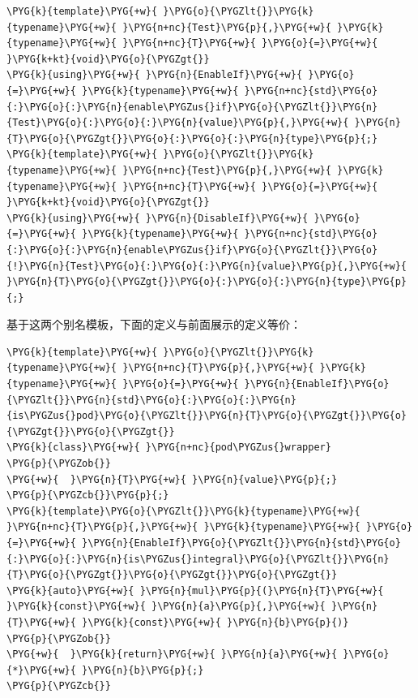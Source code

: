 \begin{codeblockbg}
\begin{Verbatim}[commandchars=\\\{\},breaklines=true,breakanywhere=true,fontsize=\codefont,xleftmargin=17bp]
\PYG{k}{template}\PYG{+w}{ }\PYG{o}{\PYGZlt{}}\PYG{k}{typename}\PYG{+w}{ }\PYG{n+nc}{Test}\PYG{p}{,}\PYG{+w}{ }\PYG{k}{typename}\PYG{+w}{ }\PYG{n+nc}{T}\PYG{+w}{ }\PYG{o}{=}\PYG{+w}{ }\PYG{k+kt}{void}\PYG{o}{\PYGZgt{}}
\PYG{k}{using}\PYG{+w}{ }\PYG{n}{EnableIf}\PYG{+w}{ }\PYG{o}{=}\PYG{+w}{ }\PYG{k}{typename}\PYG{+w}{ }\PYG{n+nc}{std}\PYG{o}{:}\PYG{o}{:}\PYG{n}{enable\PYGZus{}if}\PYG{o}{\PYGZlt{}}\PYG{n}{Test}\PYG{o}{:}\PYG{o}{:}\PYG{n}{value}\PYG{p}{,}\PYG{+w}{ }\PYG{n}{T}\PYG{o}{\PYGZgt{}}\PYG{o}{:}\PYG{o}{:}\PYG{n}{type}\PYG{p}{;}
\PYG{k}{template}\PYG{+w}{ }\PYG{o}{\PYGZlt{}}\PYG{k}{typename}\PYG{+w}{ }\PYG{n+nc}{Test}\PYG{p}{,}\PYG{+w}{ }\PYG{k}{typename}\PYG{+w}{ }\PYG{n+nc}{T}\PYG{+w}{ }\PYG{o}{=}\PYG{+w}{ }\PYG{k+kt}{void}\PYG{o}{\PYGZgt{}}
\PYG{k}{using}\PYG{+w}{ }\PYG{n}{DisableIf}\PYG{+w}{ }\PYG{o}{=}\PYG{+w}{ }\PYG{k}{typename}\PYG{+w}{ }\PYG{n+nc}{std}\PYG{o}{:}\PYG{o}{:}\PYG{n}{enable\PYGZus{}if}\PYG{o}{\PYGZlt{}}\PYG{o}{!}\PYG{n}{Test}\PYG{o}{:}\PYG{o}{:}\PYG{n}{value}\PYG{p}{,}\PYG{+w}{ }\PYG{n}{T}\PYG{o}{\PYGZgt{}}\PYG{o}{:}\PYG{o}{:}\PYG{n}{type}\PYG{p}{;}
\end{Verbatim}
\end{codeblockbg}



基于这两个别名模板，下面的定义与前面展示的定义等价：



\begin{codeblockbg}
\begin{Verbatim}[commandchars=\\\{\},breaklines=true,breakanywhere=true,fontsize=\codefont,xleftmargin=17bp]
\PYG{k}{template}\PYG{+w}{ }\PYG{o}{\PYGZlt{}}\PYG{k}{typename}\PYG{+w}{ }\PYG{n+nc}{T}\PYG{p}{,}\PYG{+w}{ }\PYG{k}{typename}\PYG{+w}{ }\PYG{o}{=}\PYG{+w}{ }\PYG{n}{EnableIf}\PYG{o}{\PYGZlt{}}\PYG{n}{std}\PYG{o}{:}\PYG{o}{:}\PYG{n}{is\PYGZus{}pod}\PYG{o}{\PYGZlt{}}\PYG{n}{T}\PYG{o}{\PYGZgt{}}\PYG{o}{\PYGZgt{}}\PYG{o}{\PYGZgt{}}
\PYG{k}{class}\PYG{+w}{ }\PYG{n+nc}{pod\PYGZus{}wrapper}
\PYG{p}{\PYGZob{}}
\PYG{+w}{  }\PYG{n}{T}\PYG{+w}{ }\PYG{n}{value}\PYG{p}{;}
\PYG{p}{\PYGZcb{}}\PYG{p}{;}
\PYG{k}{template}\PYG{o}{\PYGZlt{}}\PYG{k}{typename}\PYG{+w}{ }\PYG{n+nc}{T}\PYG{p}{,}\PYG{+w}{ }\PYG{k}{typename}\PYG{+w}{ }\PYG{o}{=}\PYG{+w}{ }\PYG{n}{EnableIf}\PYG{o}{\PYGZlt{}}\PYG{n}{std}\PYG{o}{:}\PYG{o}{:}\PYG{n}{is\PYGZus{}integral}\PYG{o}{\PYGZlt{}}\PYG{n}{T}\PYG{o}{\PYGZgt{}}\PYG{o}{\PYGZgt{}}\PYG{o}{\PYGZgt{}}
\PYG{k}{auto}\PYG{+w}{ }\PYG{n}{mul}\PYG{p}{(}\PYG{n}{T}\PYG{+w}{ }\PYG{k}{const}\PYG{+w}{ }\PYG{n}{a}\PYG{p}{,}\PYG{+w}{ }\PYG{n}{T}\PYG{+w}{ }\PYG{k}{const}\PYG{+w}{ }\PYG{n}{b}\PYG{p}{)}
\PYG{p}{\PYGZob{}}
\PYG{+w}{  }\PYG{k}{return}\PYG{+w}{ }\PYG{n}{a}\PYG{+w}{ }\PYG{o}{*}\PYG{+w}{ }\PYG{n}{b}\PYG{p}{;}
\PYG{p}{\PYGZcb{}}
\end{Verbatim}
\end{codeblockbg}



